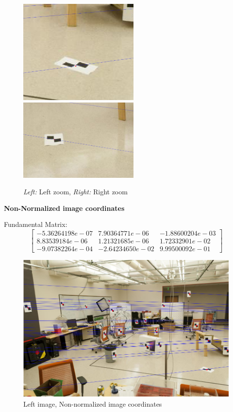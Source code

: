 \documentclass[11pt]{article}
\begin{document}
\begin{figure}[H]
    \centering
    \includegraphics[width=6cm]{images/part2/normalize_1_left_zoom.png}
    \includegraphics[width=6cm]{images/part2/normalize_1_right_zoom.png}
    \caption{\emph{Left:} Left zoom, \emph{Right:} Right zoom}
\end{figure}

\textbf{Non-Normalized image coordinates}

Fundamental Matrix:
\begin{equation*}
    \begin{bmatrix}
        -5.36264198e-07 & 7.90364771e-06 & -1.88600204e-03  \\
        8.83539184e-06 & 1.21321685e-06 & 1.72332901e-02    \\
        -9.07382264e-04 & -2.64234650e-02 & 9.99500092e-01
    \end{bmatrix}
\end{equation*}

\begin{figure}[H]
    \centering
    \includegraphics[width=15cm]{images/part2/non-normalize_1_left.png}
    \caption{Left image, Non-normalized image coordinates}
\end{figure}
\end{document}
